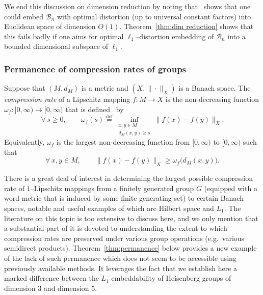 \documentclass[11pt,reqno]{amsart}
\newcommand{\0}{\mathbf{0}}
\renewcommand{\1}{\mathbf 1}
\newcommand{\from}{\colon}
\newcommand{\eqdef}{\stackrel{\mathrm{def}}{=}}
\renewcommand{\ge}{\geqslant}
\theoremstyle{remark}
\begin{document}
We end this discussion on dimension reduction by noting that~\cite{Tao19} shows that one could embed $\mathcal{B}_n$ with optimal distortion (up to universal constant factors) into Euclidean space of dimension $O(1)$.  Theorem~\ref{thm:dim reduction} shows that this fails badly  if one aims for optimal $\ell_1$--distortion embedding of $\mathcal{B}_n$ into a bounded dimensional subspace of $\ell_1$.


\subsubsection{Permanence of compression rates of groups} Suppose that $(M,d_M)$ is a metric and $(X,\|\cdot\|_X)$ is a Banach space. The {\em compression rate} of a Lipschitz mapping $f\from M\to X$ is the non-decreasing function $\omega_f\from  [0,\infty)\to [0,\infty)$  that is defined~\cite{Gro93} by
\begin{equation}\label{eq:compression rate}
\forall\, s\ge 0,\qquad \omega_f(s)\eqdef \inf_{\substack{x,y\in M\\ d_M(x,y)\ge s}} \|f(x)-f(y)\|_X.
\end{equation}
Equivalently, $\omega_f$ is the largest non-decreasing function from $[0,\infty)$ to $[0,\infty)$ such that $$\forall\, x,y\in M,\qquad \|f(x)-f(y)\|_X\ge \omega_f\big(d_M(x,y)\big).$$

There is a great deal of  interest in determining the largest possible compression rate of $1$--Lipschitz mappings from a finitely generated group $G$ (equipped with a word metric that is induced by some finite generating set) to certain Banach spaces, notable and useful examples of which are Hilbert space and $L_1$. The  literature on this topic is too extensive to discuss here, and we only mention that a substantial part of it is devoted to understanding the extent to which compression rates are preserved under various group operations (e.g.~various semidirect products). Theorem~\ref{thm:permanence} below provides a new example of the lack of such permanence which does not seem to be accessible using previously available methods. It leverages the fact that we establish here a marked difference between the $L_1$ embeddability of Heisenberg groups of dimension $3$ and dimension $5$.
\end{document}
